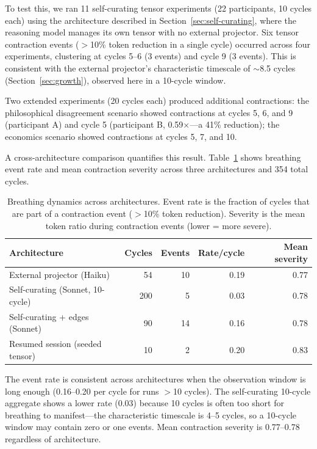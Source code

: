 To test this, we ran 11 self-curating tensor experiments (22 participants,
10 cycles each) using the architecture described in
Section~\ref{sec:self-curating}, where the reasoning model manages its own
tensor with no external projector. Six tensor contraction events
($>$10\% token reduction in a single cycle) occurred across four
experiments, clustering at cycles 5--6 (3 events) and cycle 9 (3 events).
This is consistent with the external projector's characteristic timescale
of $\sim$8.5 cycles (Section~\ref{sec:growth}), observed here in a 10-cycle
window.

Two extended experiments (20 cycles each) produced additional contractions:
the philosophical disagreement scenario showed contractions at cycles 5, 6,
and 9 (participant A) and cycle 5 (participant B, 0.59$\times$---a 41\%
reduction); the economics scenario showed contractions at cycles 5, 7,
and 10.

A cross-architecture comparison quantifies this result. Table~\ref{tab:breathing-comparison}
shows breathing event rate and mean contraction severity across three architectures
and 354 total cycles.

\begin{table}[h]
\centering
\caption{Breathing dynamics across architectures. Event rate is the fraction
of cycles that are part of a contraction event ($>$10\% token reduction).
Severity is the mean token ratio during contraction events (lower = more severe).}
\label{tab:breathing-comparison}
\begin{tabular}{lrrrr}
\toprule
Architecture & Cycles & Events & Rate/cycle & Mean severity \\
\midrule
External projector (Haiku) & 54 & 10 & 0.19 & 0.77 \\
Self-curating (Sonnet, 10-cycle) & 200 & 5 & 0.03 & 0.78 \\
Self-curating + edges (Sonnet) & 90 & 14 & 0.16 & 0.78 \\
Resumed session (seeded tensor) & 10 & 2 & 0.20 & 0.83 \\
\bottomrule
\end{tabular}
\end{table}

The event rate is consistent across architectures when the observation window
is long enough (0.16--0.20 per cycle for runs $>$10 cycles). The
self-curating 10-cycle aggregate shows a lower rate (0.03) because 10 cycles
is often too short for breathing to manifest---the characteristic timescale
is 4--5 cycles, so a 10-cycle window may contain zero or one events.
Mean contraction severity is 0.77--0.78 regardless of architecture.

